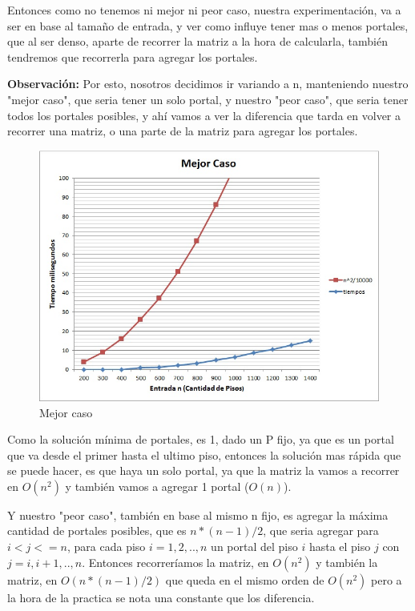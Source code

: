 Entonces como no tenemos ni mejor ni peor caso, nuestra experimentación, va a ser en base al tamaño de entrada, y ver como influye tener mas o menos portales, que al ser denso, aparte de recorrer la matriz a la hora de calcularla, también tendremos que recorrerla para agregar los portales. 

\textbf{Observación:}
Por esto, nosotros decidimos ir variando a n, manteniendo nuestro "mejor caso", que seria tener un solo portal, y nuestro "peor caso", que seria tener todos los portales posibles, y ahí vamos a ver la diferencia que tarda en volver a recorrer una matriz, o una parte de la matriz para agregar los portales.   




\begin{figure}[H]
  \begin{center}
      \includegraphics[scale=0.70]{imagenes/MejorCasoEj1.jpg}
	  \end{center}
 \caption{Mejor caso}
\end{figure}

Como la solución mínima de portales, es 1, dado un P fijo, ya que es un portal que va desde el primer hasta el ultimo piso, entonces la solución mas rápida que se puede hacer, es que haya un solo portal, ya que la matriz la vamos a recorrer en $O(n^2)$ y también vamos a agregar 1 portal ($O(n)$).



Y nuestro "peor caso", también en base al mismo n fijo, es agregar la máxima cantidad de portales posibles, que es $n*(n-1)/2$, que seria agregar para $i<j<=n$, para cada piso $i=1,2,..,n$ un portal del piso $i$ hasta el piso $j$ con $j=i,i+1,..,n$. Entonces recorreríamos la matriz, en $O(n^2)$ y también la matriz, en $O(n*(n-1)/2)$ que queda en el mismo orden de $O(n^2)$ pero a la hora de la practica se nota una constante que los diferencia. 

